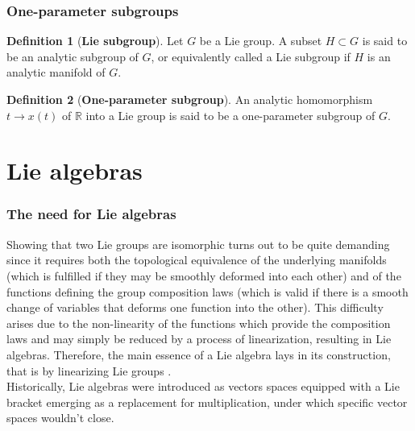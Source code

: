 \documentclass[12pt,a4paper]{report}
\theoremstyle{definition}
\newtheorem{definition}{Definition}
\theoremstyle{remark}
\theoremstyle{remark}
\begin{document}
\subsubsection{One-parameter subgroups}
\begin{definition}[\textbf{Lie subgroup}]
Let $G$ be a Lie group. A subset $H\subset G$ is said to be an analytic subgroup of $G$, or equivalently called a Lie subgroup if $H$ is an analytic manifold of $G$.
\end{definition}
\begin{definition}[\textbf{One-parameter subgroup}]
An analytic homomorphism $t\rightarrow x(t)$ of $\mathbb{R}$ into a Lie group is said to be a one-parameter subgroup of $G$.
\end{definition}

\section{Lie algebras}
\subsubsection{The need for Lie algebras}
Showing that two Lie groups are isomorphic turns out to be quite demanding since it requires both the topological equivalence of the underlying manifolds (which is fulfilled if they may be smoothly deformed into each other) and of the functions defining the group composition laws (which is valid if there is a smooth change of variables that deforms one function into the other). This difficulty arises due to the non-linearity of the functions which provide the composition laws and may simply be reduced by a process of linearization, resulting in Lie algebras. Therefore, the main essence of a Lie algebra lays in its construction, that is by linearizing Lie groups \cite{gilmore}.\\ \indent
Historically, Lie algebras were introduced as vectors spaces equipped with a Lie bracket emerging as a replacement for multiplication, under which specific vector spaces wouldn't close.
\end{document}
